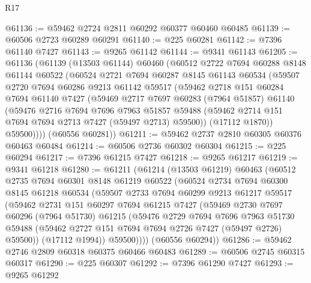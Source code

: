 \begin{lexlean}{R17}
\begin{coremodule}
@61136 := @59462 @2724 @2811 @60292 @60377 @60460 @60485
@61139 := @60506 @2723 @60289 @60291
@61140 := @225 @60281
@61142 := @7396 @61140 @7427
@61143 := @9265 @61142
@61144 := @9341 @61143
@61205 := @61136
    (@61139
      (@13503 @61144)
      @60460
      (@60512
        @2722
        @7694
        @60288
        @8148
        @61144
        @60522
        (@60524
          @2721
          @7694
          @60287
          @8145
          @61143
          @60534
          (@59507
            @2720
            @7694
            @60286
            @9213
            @61142
            @59517
            (@59462
              @2718
              @151
              @60284
              @7694
              @61140
              @7427
              (@59469
                @2717
                @7697
                @60283
                (@7964 @51857)
                @61140
                (@59476
                  @2716
                  @7694
                  @7696
                  @7963
                  @51857
                  @59488
                  (@59462 @2714 @151 @7694 @7694 @2713 @7427 (@59497 @2713) @59500))
                (@17112 @1870))
              @59500))))
      (@60556 @60281))
@61211 := @59462 @2737 @2810 @60305 @60376 @60463 @60484
@61214 := @60506 @2736 @60302 @60304
@61215 := @225 @60294
@61217 := @7396 @61215 @7427
@61218 := @9265 @61217
@61219 := @9341 @61218
@61280 := @61211
    (@61214
      (@13503 @61219)
      @60463
      (@60512
        @2735
        @7694
        @60301
        @8148
        @61219
        @60522
        (@60524
          @2734
          @7694
          @60300
          @8145
          @61218
          @60534
          (@59507
            @2733
            @7694
            @60299
            @9213
            @61217
            @59517
            (@59462
              @2731
              @151
              @60297
              @7694
              @61215
              @7427
              (@59469
                @2730
                @7697
                @60296
                (@7964 @51730)
                @61215
                (@59476
                  @2729
                  @7694
                  @7696
                  @7963
                  @51730
                  @59488
                  (@59462 @2727 @151 @7694 @7694 @2726 @7427 (@59497 @2726) @59500))
                (@17112 @1994))
              @59500))))
      (@60556 @60294))
@61286 := @59462 @2746 @2809 @60318 @60375 @60466 @60483
@61289 := @60506 @2745 @60315 @60317
@61290 := @225 @60307
@61292 := @7396 @61290 @7427
@61293 := @9265 @61292

\end{coremodule}
\end{lexlean}
